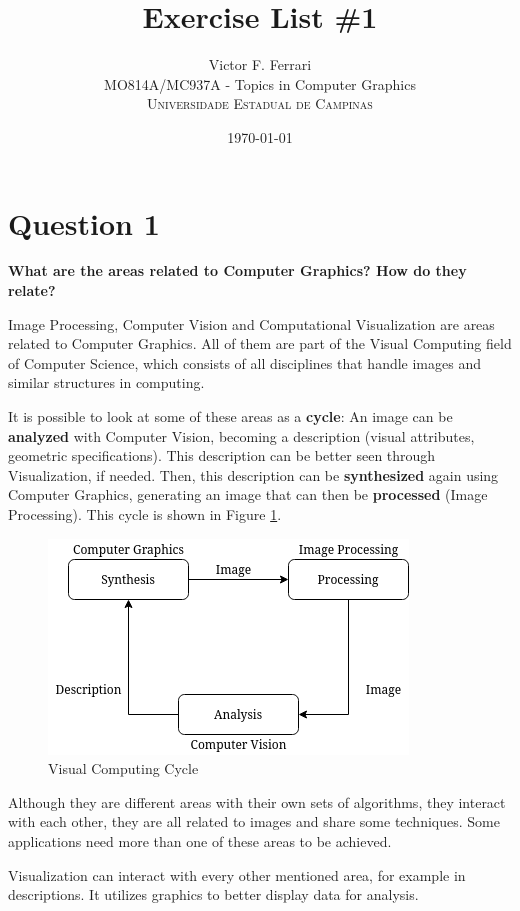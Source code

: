 \documentclass[12pt]{article}
\title{Exercise List \#1} %
\author{Victor F. Ferrari\\ %
MO814A/MC937A - Topics in Computer Graphics\\ %
\textsc{Universidade Estadual de Campinas}
}
\date{\today} %
\begin{document}
\setlength{\droptitle}{-5em}    
\maketitle


\section*{Question 1}
{\bfseries What are the areas related to Computer Graphics?  How do they relate?}

Image Processing, Computer Vision and Computational Visualization are areas related to Computer Graphics. All of them are part of the Visual Computing field of Computer Science, which consists of all disciplines that handle images and similar structures in computing. 

It is possible to look at some of these areas as a \textbf{cycle}: An image can be \textbf{analyzed} with Computer Vision, becoming a description (visual attributes, geometric specifications). This description can be better seen through Visualization, if needed. Then, this description can be \textbf{synthesized} again using Computer Graphics, generating an image that can then be \textbf{processed} (Image Processing). This cycle is shown in Figure \ref{fig:cycle}.

\begin{figure}
    \centering
    \includegraphics[width=.55\textwidth]{cycle.png}
    \caption{Visual Computing Cycle}
    \label{fig:cycle}
\end{figure}
Although they are different areas with their own sets of algorithms, they interact with each other, they are all related to images and share some techniques. Some applications need more than one of these areas to be achieved.

Visualization can interact with every other mentioned area, for example in descriptions. It utilizes graphics to better display data for analysis.
\end{document}
